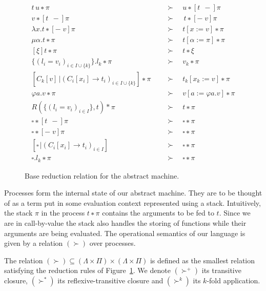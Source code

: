 \begin{figure}
  \begin{align*}
    t\,u ∗ π          &\quad\;≻\quad  u ∗ [t\;\,{-}]π   \tag{Push}\\
    v ∗ [t\;\,{-}]π   &\quad\;≻\quad  \,t ∗ [{-}\;v]π  
                         \tag{if $v ≠ \square$, Swap}\\
    λx.t ∗ [{-}\;v]π  &\quad\;≻\quad  t[x := v] ∗ π     \tag{Pop} \\
    μα.t ∗ π          &\quad\;≻\quad  t[α := π] ∗ π     \tag{Save}\\
    [ξ]t ∗ π          &\quad\;≻\quad  t ∗ ξ             \tag{Restore}\\
    \{(l_i = v_i)_{i∈I∪\{k\}}\}.l_k ∗ π
                      &\quad\;≻\quad  v_k ∗ π           \tag{Find}\\
    [C_k[v]\,| (C_i[x_i] → t_i)_{i∈I∪\{k\}}] ∗ π
                      &\quad\;≻\quad  t_k[x_k := v] ∗ π \tag{Match}\\
    φa.v ∗ π          &\quad\;≻\quad  v[a := φa.v] ∗ π  \tag{Unfold}\\
    R(\{(l_i = v_i)_{i∈I}\},t) * π
                      &\quad\;≻\quad  t ∗ π             \tag{R-Rule}\\
    \square ∗ [t\;\,{-}]π
                      &\quad\;≻\quad  \square ∗ π       \tag{Erase 1}\\
    \square ∗ [{-}\;v]π
                      &\quad\;≻\quad  \square ∗ π       \tag{Erase 2}\\
    [\square\,| (C_i[x_i] → t_i)_{i∈I}]
                      &\quad\;≻\quad  \square ∗ π       \tag{Erase 3}\\
    \square.l_k ∗ π   &\quad\;≻\quad  \square ∗ π       \tag{Erase 4}
  \end{align*}
  \caption{Base reduction relation for the abstract machine.}
  \label{fig:base_red}
\end{figure}

Processes form the internal state of our abstract machine. They are to be
thought of as a term put in some evaluation context represented using a
stack. Intuitively, the stack $π$ in the process $t∗π$ contains the
arguments to be fed to $t$. Since we are in call-by-value the stack also
handles the storing of functions while their arguments are being evaluated.
The operational semantics of our language is given by a relation $(≻)$
over processes.
\begin{definition}
  The relation $(≻) ⊆ (Λ×Π) × (Λ×Π)$ is defined as the smallest relation
  satisfying the reduction rules of Figure~\ref{fig:base_red}. We denote
  $(≻^{+})$ its transitive closure, $(≻^{*})$ its reflexive-transitive
  closure and $(≻^k)$ its $k$-fold application.
\end{definition}

